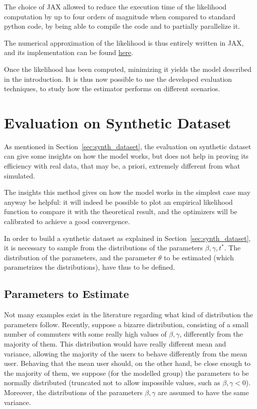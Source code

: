 The choice of JAX allowed to reduce the execution time of the likelihood computation by up to four orders of magnitude when compared to standard python code,
by being able to compile the code and to partially parallelize it.

The numerical approximation of the likelihood is thus entirely written in JAX,
and its implementation can be found \href{https://github.com/Piripuz/Inverse_Vickrey}{here}.

Once the likelihood has been computed,
minimizing it yields the model described in the introduction.
It is thus now possible to use the developed evaluation techniques,
to study how the estimator performs on different scenarios.

\section{Evaluation on Synthetic Dataset}
\label{sec:eval_synth_dataset}

As mentioned in Section~\ref{sec:synth_dataset},
the evaluation on synthetic dataset can give some insights on how the model works,
but does not help in proving its efficiency with real data,
that may be, a priori, extremely different from what simulated.

The insights this method gives on how the model works in the simplest case may anyway be helpful:
it will indeed be possible to plot an empirical likelihood function to compare it with the theoretical result,
and the optimizers will be calibrated to achieve a good convergence.

In order to build a synthetic dataset as explained in Section~\ref{sec:synth_dataset},
it is necessary to sample from the distributions of the parameters \(\beta, \gamma, t^*\).
The distribution of the parameters,
and the parameter \(\theta\) to be estimated (which parametrizes the distributions),
have thus to be defined.

\subsection{Parameters to Estimate}

Not many examples exist in the literature regarding what kind of distribution the parameters follow.
Recently, \textcite{https://doi.org/10.1111/iere.12692} suppose a bizarre distribution,
consisting of a small number of commuters with some really high values of \(\beta, \gamma\),
differently from the majority of them.
This distribution would have really different mean and variance,
allowing the majority of the users to behave differently from the mean user.
Behaving that the mean user should, on the other hand,
be close enough to the majority of them, we suppose
(for the modelled group) the parameters to be normally distributed
(truncated not to allow impossible values, such as \(\beta, \gamma < 0\)).
Moreover, the distributions of the parameters \(\beta, \gamma\) are assumed to have the same variance.

